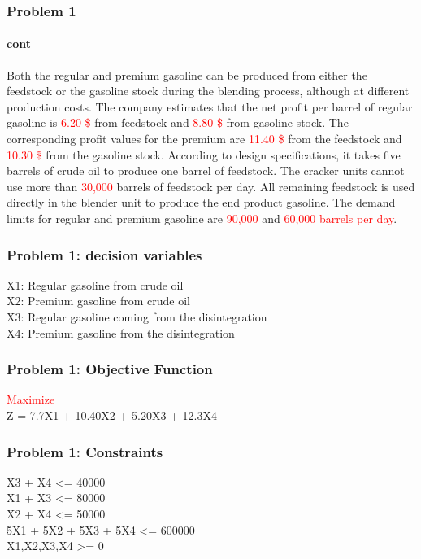 \documentclass[10pt,svgnames,fragile]{beamer}
\begin{document}
\begin{frame}
\frametitle{Problem 1}
\framesubtitle{cont}
Both the regular and premium gasoline can be produced from either the feedstock or the gasoline stock during the blending process, although at different production costs. The company estimates that the net profit per barrel of regular gasoline is \textcolor{red}{6.20 \$} from feedstock and \textcolor{red}{8.80 \$} from gasoline stock. The corresponding profit values for the premium are \textcolor{red}{11.40 \$} from the feedstock and \textcolor{red}{10.30 \$} from the gasoline stock. According to design specifications, it takes five barrels of crude oil to produce one barrel of feedstock. The cracker units cannot use more than \textcolor{red}{30,000} barrels of feedstock per day. All remaining feedstock is used directly in the blender unit to produce the end product gasoline. The demand limits for regular and premium gasoline are \textcolor{red}{90,000} and \textcolor{red}{60,000 barrels per day}.



\end{frame}
\begin{frame}[label={sec:orge9abdcb}]{}

\frametitle{Problem 1: decision variables}

X1: Regular gasoline from crude oil\\
X2: Premium gasoline from crude oil\\
X3: Regular gasoline coming from the disintegration\\
X4: Premium gasoline from the disintegration\\

\end{frame}

\begin{frame}[label={sec:orge9abdcb}]{}

\frametitle{Problem 1:  Objective Function }
\textcolor{red}{Maximize}\\[1em]
Z = 7.7X1 + 10.40X2 + 5.20X3 + 12.3X4\\

\end{frame}

\begin{frame}[label={sec:orge9abdcb}]{}

\frametitle{Problem 1:  Constraints }

X3 + X4 <= 40000\\
X1 + X3 <= 80000\\
X2 + X4 <= 50000\\
5X1 + 5X2 + 5X3 + 5X4 <= 600000\\
X1,X2,X3,X4 >= 0

\end{frame}
\end{document}
